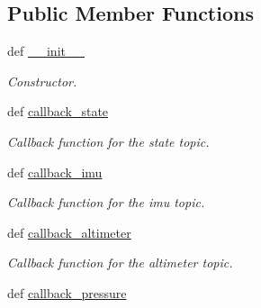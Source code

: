 \subsection*{Public Member Functions}
\begin{DoxyCompactItemize}
\item 
def \hyperlink{classspiri__api_1_1get__state_1_1_staterobot_a015efa1f3a59211063e167ec0cb1fc3b}{\-\_\-\-\_\-init\-\_\-\-\_\-}
\begin{DoxyCompactList}\small\item\em Constructor. \end{DoxyCompactList}\item 
def \hyperlink{classspiri__api_1_1get__state_1_1_staterobot_a81570bdf94a8ea111eb9a51b3044c70d}{callback\-\_\-state}
\begin{DoxyCompactList}\small\item\em Callback function for the state topic. \end{DoxyCompactList}\item 
\hypertarget{classspiri__api_1_1get__state_1_1_staterobot_a9136ac9a32b6c7092b3f00ee0fddc3e8}{def \hyperlink{classspiri__api_1_1get__state_1_1_staterobot_a9136ac9a32b6c7092b3f00ee0fddc3e8}{callback\-\_\-imu}}\label{classspiri__api_1_1get__state_1_1_staterobot_a9136ac9a32b6c7092b3f00ee0fddc3e8}

\begin{DoxyCompactList}\small\item\em Callback function for the imu topic. \end{DoxyCompactList}\item 
\hypertarget{classspiri__api_1_1get__state_1_1_staterobot_aee8415185786cc6016fc86bc7e0fcd34}{def \hyperlink{classspiri__api_1_1get__state_1_1_staterobot_aee8415185786cc6016fc86bc7e0fcd34}{callback\-\_\-altimeter}}\label{classspiri__api_1_1get__state_1_1_staterobot_aee8415185786cc6016fc86bc7e0fcd34}

\begin{DoxyCompactList}\small\item\em Callback function for the altimeter topic. \end{DoxyCompactList}\item 
\hypertarget{classspiri__api_1_1get__state_1_1_staterobot_a7597952c4302e24b63fbbc2653221bc9}{def \hyperlink{classspiri__api_1_1get__state_1_1_staterobot_a7597952c4302e24b63fbbc2653221bc9}{callback\-\_\-pressure}}\label{classspiri__api_1_1get__state_1_1_staterobot_a7597952c4302e24b63fbbc2653221bc9}


\end{DoxyCompactItemize}
